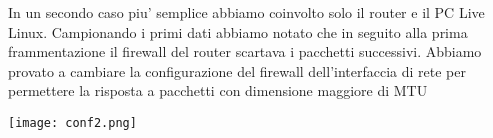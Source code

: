 \documentclass[../lab2.tex]{subfiles}
\begin{document}
    In un secondo caso piu' semplice abbiamo coinvolto solo il router e 
    il PC Live Linux.
    Campionando i primi dati abbiamo notato che in seguito alla prima frammentazione
    il firewall del router scartava i pacchetti successivi. Abbiamo provato a cambiare
    la configurazione del firewall dell'interfaccia di rete per permettere la risposta 
    a pacchetti con dimensione maggiore di MTU

    \begin{center}
        \texttt{[image: conf2.png]}
    \end{center}
\end{document}
